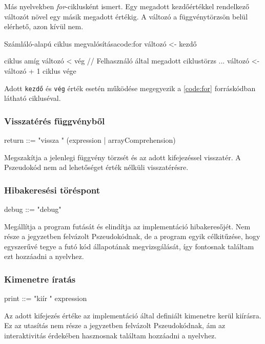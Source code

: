 Más nyelvekben \textit{for}-ciklusként ismert. Egy megadott kezdőértékkel rendelkező változót növel egy másik megadott értékig. A változó a függvénytörzsön belül elérhető, azon kívül nem.

\begin{code}{Számláló-alapú ciklus megvalósítása}{code:for}
változó <- kezdő

ciklus amíg változó < vég
    // Felhasználó által megadott ciklustörzs ...
    változó <- változó + 1
ciklus vége
\end{code}

Adott \texttt{kezdő} és \texttt{vég} érték esetén működése megegyezik a \ref{code:for} forráskódban látható cikluséval.

\subsubsection{Visszatérés függvényből}

\begin{ebnf}
return ::= "vissza " (expression | arrayComprehension) 
\end{ebnf}

Megszakítja a jelenlegi függvény törzsét és az adott kifejezéssel visszatér. A Pszeudokód nem ad lehetőséget érték nélküli visszatérésre.

\subsubsection{Hibakeresési töréspont}

\begin{ebnf}
debug ::= "debug"
\end{ebnf}

Megállítja a program futását és elindítja az implementáció hibakeresőjét. Nem része a jegyzetben felvázolt Pszeudokódnak, de a program egyik célkitűzése, hogy egyszerűvé tegye a futó kód állapotának megvizsgálását, így fontosnak találtam ezt hozzáadni a nyelvhez.

\subsubsection{Kimenetre íratás}

\begin{ebnf}
print ::= "kiír " expression
\end{ebnf}

Az adott kifejezés értéke az implementáció által definiált kimenetre kerül kiírásra. Ez az utasítás nem része a jegyzetben felvázolt Pszeudokódnak, ám az interaktivitás érdekében hasznosnak találtam hozzáadni a nyelvhez.

